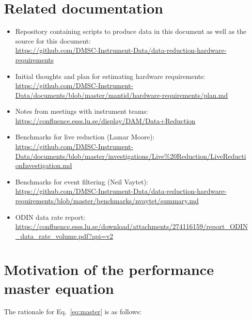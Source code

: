 \documentclass[a4paper,english,numbers=noenddot,bibliography=totoc,chapterprefix=on,DIV=12]{scrartcl}
\newcommand{\odin}{ODIN\xspace}
\begin{document}
\section{Related documentation}
\label{app:refs}

\begin{itemize}
  \item Repository containing scripts to produce data in this document as well as the source for this document:\\
    \url{https://github.com/DMSC-Instrument-Data/data-reduction-hardware-requirements}
  \item Initial thoughts and plan for estimating hardware requirements:\\
    \url{https://github.com/DMSC-Instrument-Data/documents/blob/master/mantid/hardware-requirements/plan.md}
  \item Notes from meetings with instrument teams:\\
    \url{https://confluence.esss.lu.se/display/DAM/Data+Reduction}
  \item Benchmarks for live reduction (Lamar Moore):\\
    \url{https://github.com/DMSC-Instrument-Data/documents/blob/master/investigations/Live%20Reduction/LiveReductionInvestigation.md}
  \item Benchmarks for event filtering (Neil Vaytet):\\
    \url{https://github.com/DMSC-Instrument-Data/data-reduction-hardware-requirements/blob/master/benchmarks/nvaytet/summary.md}
  \item \odin data rate report:\\
    \url{https://confluence.esss.lu.se/download/attachments/274116159/report_ODIN_data_rate_volume.pdf?api=v2}
\end{itemize}




\section{Motivation of the performance master equation}
\label{app:master_eq}

The rationale for Eq.~\eqref{eq:master} is as follows:
\end{document}
